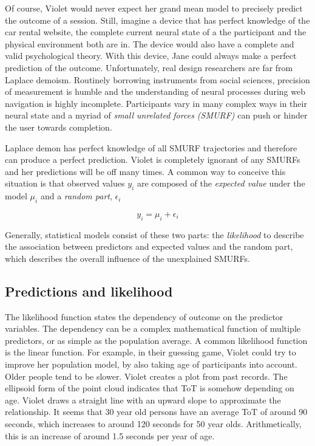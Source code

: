 \documentclass[]{svmono}
\begin{document}
Of course, Violet would never expect her grand mean model to precisely
predict the outcome of a session. Still, imagine a device that has
perfect knowledge of the car rental website, the complete current neural
state of a the participant and the physical environment both are in. The
device would also have a complete and valid psychological theory. With
this device, Jane could always make a perfect prediction of the outcome.
Unfortunately, real design researchers are far from Laplace demoism.
Routinely borrowing instruments from social sciences, precision of
measurement is humble and the understanding of neural processes during
web navigation is highly incomplete. Participants vary in many complex
ways in their neural state and a myriad of \emph{small unrelated forces
(SMURF)} can push or hinder the user towards completion.

Laplace demon has perfect knowledge of all SMURF trajectories and
therefore can produce a perfect prediction. Violet is completely
ignorant of any SMURFs and her predictions will be off many times. A
common way to conceive this situation is that observed values \(y_i\)
are composed of the \emph{expected value} under the model \(\mu_i\) and
a \emph{random part}, \(\epsilon_i\)

\[y_i = \mu_i + \epsilon_i\]

Generally, statistical models consist of these two parts: the
\emph{likelihood} to describe the association between predictors and
expected values and the random part, which describes the overall
influence of the unexplained SMURFs.

\subsection{Predictions and
likelihood}\label{predictions-and-likelihood}

The likelihood function states the dependency of outcome on the
predictor variables. The dependency can be a complex mathematical
function of multiple predictors, or as simple as the population average.
A common likelihood function is the linear function. For example, in
their guessing game, Violet could try to improve her population model,
by also taking age of participants into account. Older people tend to be
slower. Violet creates a plot from past records. The ellipsoid form of
the point cloud indicates that ToT is somehow depending on age. Violet
draws a straight line with an upward slope to approximate the
relationship. It seems that 30 year old persons have an average ToT of
around 90 seconds, which increases to around 120 seconds for 50 year
olds. Arithmetically, this is an increase of around 1.5 seconds per year
of age.
\end{document}
